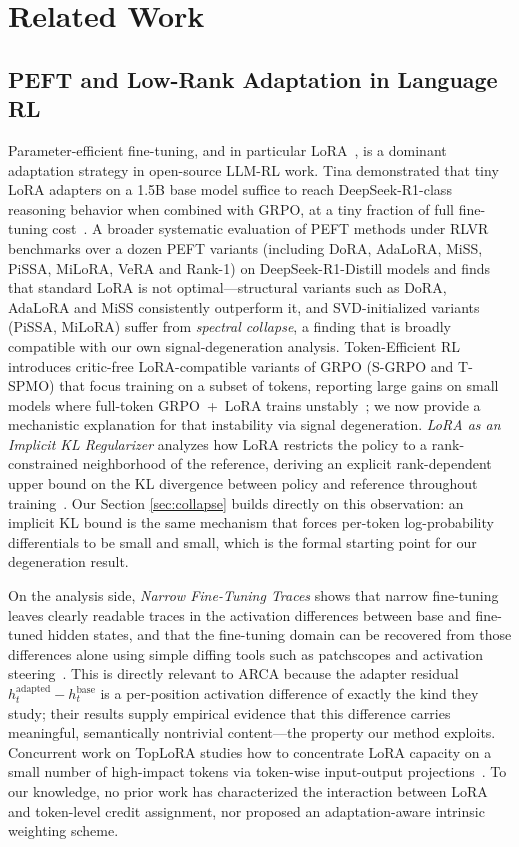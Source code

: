 \section{Related Work}\label{sec:related-work}

\subsection{PEFT and Low-Rank Adaptation in Language RL}\label{sec:rw-peft}

Parameter-efficient fine-tuning, and in particular LoRA~\cite{hu2021lora}, is a
dominant adaptation strategy in open-source LLM-RL work. Tina
demonstrated that tiny LoRA adapters on a 1.5B base model suffice to reach
DeepSeek-R1-class reasoning behavior when combined with GRPO, at a tiny fraction of
full fine-tuning cost~\cite{wang2025tina}. A broader systematic evaluation of PEFT
methods under RLVR~\cite{yin2025peftrlvr} benchmarks over a dozen PEFT variants
(including DoRA, AdaLoRA, MiSS, PiSSA, MiLoRA, VeRA and Rank-1) on DeepSeek-R1-Distill
models and finds that standard LoRA is not optimal---structural variants such as DoRA,
AdaLoRA and MiSS consistently outperform it, and SVD-initialized variants (PiSSA,
MiLoRA) suffer from \emph{spectral collapse}, a finding that is broadly compatible with
our own signal-degeneration analysis. Token-Efficient RL introduces critic-free LoRA-compatible
variants of GRPO (S-GRPO and T-SPMO) that focus training on a subset of tokens,
reporting large gains on small models where full-token GRPO~+~LoRA trains
unstably~\cite{lee2025tokenefficientrl}; we now provide a mechanistic explanation for
that instability via signal degeneration. \emph{LoRA as an Implicit KL Regularizer}
analyzes how LoRA restricts the policy to a rank-constrained neighborhood of the
reference, deriving an explicit rank-dependent upper bound on the KL divergence between
policy and reference throughout training~\cite{anon2026implicitklra}. Our Section
\ref{sec:collapse} builds directly on this observation: an implicit KL bound is the
same mechanism that forces per-token log-probability differentials to be small and
small, which is the formal starting point for our degeneration result.

On the analysis side, \emph{Narrow Fine-Tuning Traces} shows that narrow
fine-tuning leaves clearly readable traces in the activation differences between
base and fine-tuned hidden states, and that the fine-tuning domain can be
recovered from those differences alone using simple diffing tools such as
patchscopes and activation steering~\cite{minder2025narrowfinetuning}. This is
directly relevant to ARCA because the adapter residual
$h^{\mathrm{adapted}}_t - h^{\mathrm{base}}_t$ is a per-position activation
difference of exactly the kind they study; their results supply empirical
evidence that this difference carries meaningful, semantically nontrivial
content---the property our method exploits. Concurrent work on
TopLoRA studies how to concentrate LoRA capacity on a small number of
high-impact tokens via token-wise input-output projections~\cite{li2025toplora}. To our knowledge, no prior work has characterized the
interaction between LoRA and token-level credit assignment, nor proposed an
adaptation-aware intrinsic weighting scheme.

